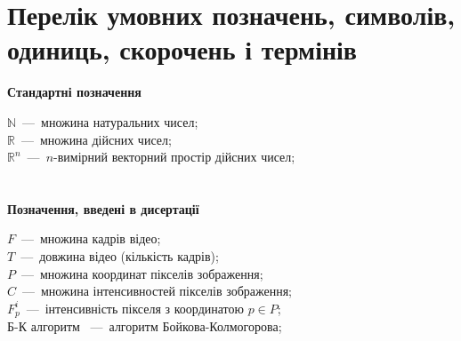 \chapter*{Перелік умовних позначень, символів, одиниць, скорочень і термінів}

\textbf{Стандартні позначення}

 \noindent$\mathbb{N}$~---~множина натуральних чисел; \\
 \noindent$\mathbb{R}$~---~множина дійсних чисел; \\
 \noindent$\mathbb{R}^n$~---~$n$-вимірний векторний простір дійсних чисел; \\
\\
\\
\textbf{Позначення, введені в дисертації}

 \noindent$F$~---~множина кадрів відео; \\
 \noindent$T$~---~довжина відео (кількість кадрів); \\
 \noindent$P$~---~множина координат пікселів зображення; \\
 \noindent$C$~---~множина інтенсивностей пікселів зображення; \\
 \noindent$F_p^i$~---~інтенсивність пікселя з координатою $p$$\in$$P$; \\
 Б-К алгоритм ~---~алгоритм Бойкова-Колмогорова; \\
